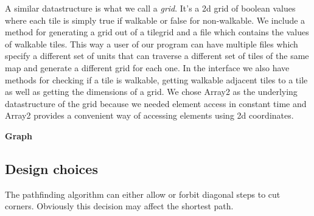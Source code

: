 \documentclass[12pt, a4paper]{article}
\begin{document}
A similar datastructure is what we call a \textit{grid}. It's a 2d grid of boolean values where each tile is simply true if walkable or false for non-walkable. We include a method for generating a grid out of a tilegrid and a file which contains the values of walkable tiles. This way a user of our program can have multiple files which specify a different set of units that can traverse a different set of tiles of the same map and generate a different grid for each one. In the interface we also have methods for checking if a tile is walkable, getting walkable adjacent tiles to a tile as well as getting the dimensions of a grid. We chose Array2 as the underlying datastructure of the grid because we needed element access in constant time and Array2 provides a convenient way of accessing elements using 2d coordinates.

\textbf{Graph}






\subsection{Design choices}







The pathfinding algorithm can either allow or forbit diagonal steps to cut
corners. Obviously this decision may affect the shortest path. \cite{astar2}

\end{document}
